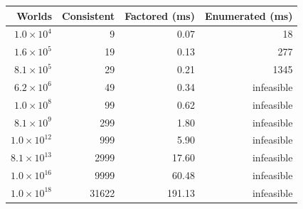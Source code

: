 \begin{tabular}{rrrr}
\toprule
Worlds & Consistent & Factored (ms) & Enumerated (ms) \\
\midrule
$1.0\times10^{4}$ & 9 & 0.07 & 18 \\
$1.6\times10^{5}$ & 19 & 0.13 & 277 \\
$8.1\times10^{5}$ & 29 & 0.21 & 1345 \\
$6.2\times10^{6}$ & 49 & 0.34 & infeasible \\
$1.0\times10^{8}$ & 99 & 0.62 & infeasible \\
$8.1\times10^{9}$ & 299 & 1.80 & infeasible \\
$1.0\times10^{12}$ & 999 & 5.90 & infeasible \\
$8.1\times10^{13}$ & 2999 & 17.60 & infeasible \\
$1.0\times10^{16}$ & 9999 & 60.48 & infeasible \\
$1.0\times10^{18}$ & 31622 & 191.13 & infeasible \\
\bottomrule
\end{tabular}

